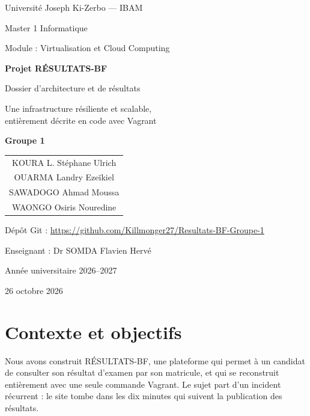 \documentclass[a4paper,11pt]{article}
\begin{document}
\begin{titlepage}
  \centering
  {\large Université Joseph Ki-Zerbo --- IBAM\par}
  {\large Master 1 Informatique\par}
  {\large Module : Virtualisation et Cloud Computing\par}
  \vspace{2.2cm}
  {\Huge\bfseries Projet RÉSULTATS-BF\par}
  \vspace{0.6cm}
  {\LARGE Dossier d'architecture et de résultats\par}
  \vspace{0.6cm}
  {\large Une infrastructure résiliente et scalable,\\ entièrement décrite en code avec Vagrant\par}
  \vspace{2.2cm}
  {\large\bfseries Groupe 1\par}
  \vspace{0.5cm}
  \begin{tabular}{c}
     KOURA L. Stéphane Ulrich\\ OUARMA Landry Ezeïkiel\\ SAWADOGO Ahmad Moussa\\  WAONGO Osiris Nouredine
  \end{tabular}\par
  \vspace{0.9cm}
  {\normalsize Dépôt Git : \url{https://github.com/Killmonger27/Resultats-BF-Groupe-1}\par}
  \vfill
  {\large Enseignant : Dr SOMDA Flavien Hervé\par}
  \vspace{0.2cm}
  {\large Année universitaire 2026--2027\par}
  \vspace{0.2cm}
  {\large 26 octobre 2026\par}
\end{titlepage}

\setcounter{tocdepth}{1}
\tableofcontents
\newpage

\section{Contexte et objectifs}

Nous avons construit RÉSULTATS-BF, une plateforme qui permet à un candidat de consulter son résultat d'examen par son matricule, et qui se reconstruit entièrement avec une seule commande Vagrant. Le sujet part d'un incident récurrent : le site tombe dans les dix minutes qui suivent la publication des résultats.
\end{document}

